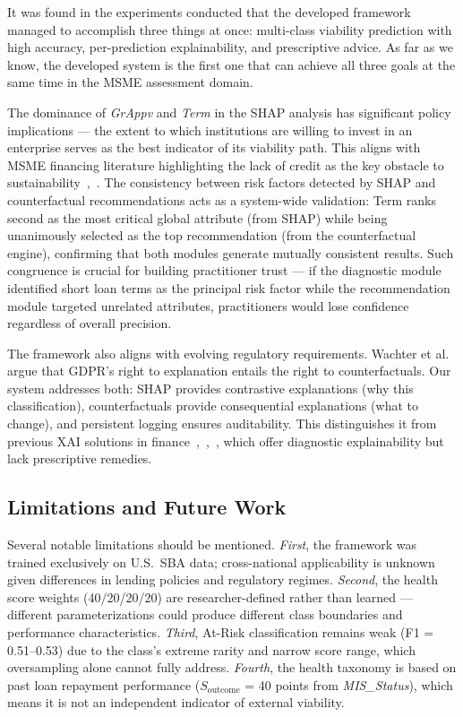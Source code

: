 \documentclass[conference]{IEEEtran}
\begin{document}
It was found in the experiments conducted that the developed framework managed to accomplish three things at once: multi-class viability prediction with high accuracy, per-prediction explainability, and prescriptive advice. As far as we know, the developed system is the first one that can achieve all three goals at the same time in the MSME assessment domain.

The dominance of \textit{GrAppv} and \textit{Term} in the SHAP analysis has significant policy implications --- the extent to which institutions are willing to invest in an enterprise serves as the best indicator of its viability path. This aligns with MSME financing literature highlighting the lack of credit as the key obstacle to sustainability~\cite{6},~\cite{7}. The consistency between risk factors detected by SHAP and counterfactual recommendations acts as a system-wide validation: Term ranks second as the most critical global attribute (from SHAP) while being unanimously selected as the top recommendation (from the counterfactual engine), confirming that both modules generate mutually consistent results. Such congruence is crucial for building practitioner trust --- if the diagnostic module identified short loan terms as the principal risk factor while the recommendation module targeted unrelated attributes, practitioners would lose confidence regardless of overall precision.

The framework also aligns with evolving regulatory requirements. Wachter et al.~\cite{19} argue that GDPR's right to explanation entails the right to counterfactuals. Our system addresses both: SHAP provides contrastive explanations (why this classification), counterfactuals provide consequential explanations (what to change), and persistent logging ensures auditability. This distinguishes it from previous XAI solutions in finance~\cite{22},~\cite{23},~\cite{24}, which offer diagnostic explainability but lack prescriptive remedies.

\subsection{Limitations and Future Work}

Several notable limitations should be mentioned. \textit{First}, the framework was trained exclusively on U.S.\ SBA data; cross-national applicability is unknown given differences in lending policies and regulatory regimes. \textit{Second}, the health score weights (40/20/20/20) are researcher-defined rather than learned --- different parameterizations could produce different class boundaries and performance characteristics. \textit{Third}, At-Risk classification remains weak (F1 = 0.51--0.53) due to the class's extreme rarity and narrow score range, which oversampling alone cannot fully address. \textit{Fourth}, the health taxonomy is based on past loan repayment performance ($S_{\text{outcome}}$ = 40 points from \textit{MIS\_Status}), which means it is not an independent indicator of external viability.
\end{document}
